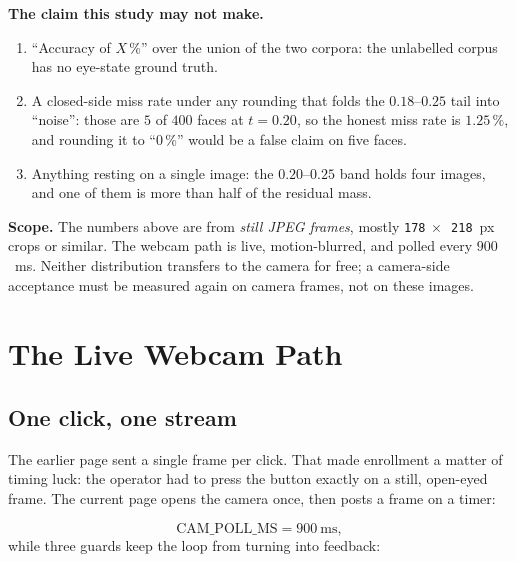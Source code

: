 \documentclass[11pt,a4paper]{article}
\newcommand{\coden}[1]{\texttt{\small #1}}
\begin{document}
\begin{warnbox}
\textbf{The claim this study may not make.}
\begin{enumerate}[nosep]
  \item ``Accuracy of $X$\,\%'' over the union of the two corpora: the
        unlabelled corpus has no eye-state ground truth.
  \item A closed-side miss rate under any rounding that folds the
        $0.18$--$0.25$ tail into ``noise'': those are $5$ of $400$ faces at
        $t=0.20$, so the honest miss rate is $1.25\,\%$, and rounding it to
        ``$0\,\%$'' would be a false claim on five faces.
  \item Anything resting on a single image: the $0.20$--$0.25$ band holds
        four images, and one of them is more than half of the residual
        mass.
\end{enumerate}
\end{warnbox}

\begin{warnbox}
\textbf{Scope.} The numbers above are from \emph{still JPEG frames},
mostly \coden{178}$~\times$~\coden{218}~px crops or similar. The webcam path
is live, motion-blurred, and polled every $900$~ms. Neither distribution
transfers to the camera for free; a camera-side acceptance must be
measured again on camera frames, not on these images.
\end{warnbox}
\section{The Live Webcam Path}
\label{sec:webcam}

\subsection{One click, one stream}

The earlier page sent a single frame per click. That made enrollment a
matter of timing luck: the operator had to press the button exactly on a
still, open-eyed frame. The current page opens the camera once, then
posts a frame on a timer:

\begin{equation}
  \mathrm{CAM\_POLL\_MS} = 900\ \text{ms},
\end{equation}
while three guards keep the loop from turning into feedback:
\end{document}
